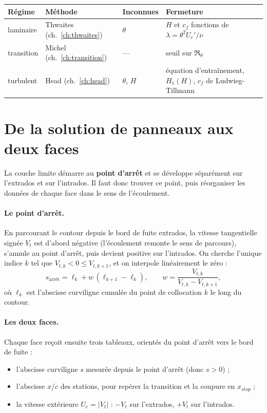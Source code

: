 \begin{center}
\begin{tabularx}{\linewidth}{lllX}
\toprule
Régime & Méthode & Inconnues & Fermeture \\
\midrule
laminaire & Thwaites (ch.~\ref{ch:thwaites}) & $\theta$ & $H$ et $c_f$ fonctions de $\lambda=\theta^2U_e'/\nu$ \\
transition & Michel (ch.~\ref{ch:transition}) & --- & seuil sur $\Re_\theta$ \\
turbulent & Head (ch.~\ref{ch:head}) & $\theta$, $H$ & équation d'entraînement, $H_1(H)$, $c_f$ de Ludwieg-Tillmann \\
\bottomrule
\end{tabularx}
\end{center}

\section{De la solution de panneaux aux deux faces}
La couche limite démarre au \textbf{point d'arrêt} et se développe séparément sur l'extrados et sur l'intrados. Il faut donc trouver ce point, puis réorganiser les données de chaque face dans le sens de l'écoulement.

\paragraph{Le point d'arrêt.} En parcourant le contour depuis le bord de fuite extrados, la vitesse tangentielle signée $V_t$ est d'abord négative (l'écoulement remonte le sens de parcours), s'annule au point d'arrêt, puis devient positive sur l'intrados. On cherche l'unique indice $k$ tel que $V_{t,k}<0\le V_{t,k+1}$, et on interpole linéairement le zéro :
\[
s_{\text{arrêt}}=\ell_k+w\,(\ell_{k+1}-\ell_k),\qquad w=\frac{V_{t,k}}{V_{t,k}-V_{t,k+1}},
\]
où $\ell_k$ est l'abscisse curviligne cumulée du point de collocation $k$ le long du contour.

\paragraph{Les deux faces.} Chaque face reçoit ensuite trois tableaux, orientés du point d'arrêt vers le bord de fuite :
\begin{itemize}
\item l'abscisse curviligne $s$ mesurée depuis le point d'arrêt (donc $s>0$) ;
\item l'abscisse $x/c$ des stations, pour repérer la transition et la coupure en $x_{stop}$ ;
\item la vitesse extérieure $U_e=|V_t|$ : $-V_t$ sur l'extrados, $+V_t$ sur l'intrados.
\end{itemize}

